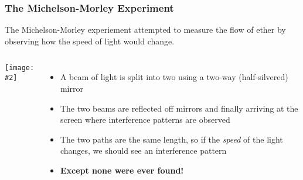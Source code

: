 \documentclass[12pt,compress,aspectratio=169]{beamer}
\newcommand{\pic}[2]{\texttt{[image: \#2]}}
\newcommand{\bigsqrt}{\ensuremath\sqrt{1-\left(\frac{v}{c}\right)^2}}
\newcommand{\lorentz}{\ensuremath\frac{1}{\bigsqrt}}
\newcommand{\eq}[2]{\vspace{#1}{\Large\begin{displaymath}#2\end{displaymath}}}
\begin{document}
\begin{frame}
  \frametitle{The Michelson-Morley Experiment}
  The Michelson-Morley experiement attempted to measure the flow of ether by
  observing how the speed of light would change.
  \begin{columns}
    \begin{center}
      \pic{1.1}{graphics/313754.jpg}
    \end{center}

    \begin{itemize}
    \item A beam of light is split into two using a two-way (half-silvered)
      mirror
    \item The two beams are reflected off mirrors and finally arriving at the
      screen where interference patterns are observed
    \item The two paths are the same length, so if the \emph{speed} of the light
      changes, we should see an interference pattern
    \item\textbf{Except none were ever found!}
    \end{itemize}
  \end{columns}
\end{frame}


%    
%    
%      
\end{document}
